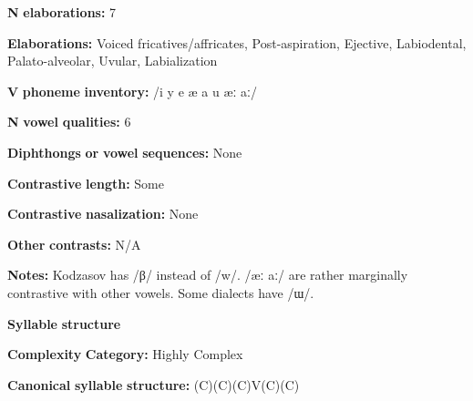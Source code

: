 \documentclass[output=paper]{langsci/langscibook}
\begin{document}
\begin{styleBody}
\textbf{N} \textbf{elaborations:} 7
\end{styleBody}

\begin{styleBody}
\textbf{Elaborations:} Voiced fricatives/affricates, Post-aspiration, Ejective, Labiodental, Palato-alveolar, Uvular, Labialization
\end{styleBody}

\begin{styleBody}
\textbf{V} \textbf{phoneme} \textbf{inventory:} /i y e æ a u æː aː/
\end{styleBody}

\begin{styleBody}
\textbf{N} \textbf{vowel} \textbf{qualities:} 6
\end{styleBody}

\begin{styleBody}
\textbf{Diphthongs} \textbf{or} \textbf{vowel} \textbf{sequences:} None
\end{styleBody}

\begin{styleBody}
\textbf{Contrastive} \textbf{length:} Some
\end{styleBody}

\begin{styleBody}
\textbf{Contrastive} \textbf{nasalization:} None
\end{styleBody}

\begin{styleBody}
\textbf{Other} \textbf{contrasts:} N/A
\end{styleBody}

\begin{styleBody}
\textbf{Notes:} Kodzasov has /β/ instead of /w/. /æː aː/ are rather marginally contrastive with other vowels. Some dialects have /ɯ/.
\end{styleBody}

\begin{styleBody}
\textbf{Syllable} \textbf{structure}
\end{styleBody}

\begin{styleBody}
\textbf{Complexity} \textbf{Category:} Highly Complex
\end{styleBody}

\begin{styleBody}
\textbf{Canonical} \textbf{syllable} \textbf{structure:} (C)(C)(C)V(C)(C) \citep[40-46]{Haspelmath1993}
\end{styleBody}
\end{document}
